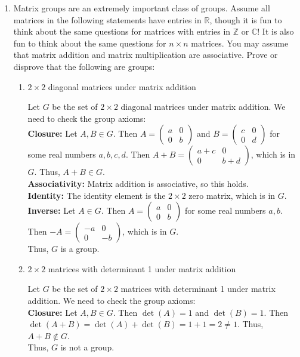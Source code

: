 \documentclass[10pt,twoside]{article}
\newcommand\R{\mathbb{R}}
\newcommand\C{\mathbb{C}}
\newcommand\Z{\mathbb{Z}}
\begin{document}
\begin{itemize}
\begin{enumerate}
\begin{enumerate}
\begin{solution}
            \end{solution}
		 \end{enumerate}		
 		 \item Matrix groups are an extremely important class of groups. Assume all matrices in the following statements have entries in $\R$, though it is fun to think about the same questions for matrices with entries in $\Z$ or $\C$! It is also fun to think about the same questions for $n \times n$ matrices. You may assume that matrix addition and matrix multiplication are associative. Prove or disprove that the following are groups:
		 \begin{enumerate}
		 	\item $2 \times 2$ diagonal matrices under matrix addition
		 	\begin{solution}
                Let $G$ be the set of $2 \times 2$ diagonal matrices under matrix addition. We need to check the group axioms: \\ 
                \textbf{Closure:} Let $A, B \in G$. Then $A = \begin{pmatrix} a & 0 \\ 0 & b \end{pmatrix}$ and $B = \begin{pmatrix} c & 0 \\ 0 & d \end{pmatrix}$ for some real numbers $a, b, c, d$. Then $A + B = \begin{pmatrix} a + c & 0 \\ 0 & b + d \end{pmatrix}$, which is in $G$. Thus, $A + B \in G$. \\
                \textbf{Associativity:} Matrix addition is associative, so this holds. \\
                \textbf{Identity:} The identity element is the $2 \times 2$ zero matrix, which is in $G$. \\
                \textbf{Inverse:} Let $A \in G$. Then $A = \begin{pmatrix} a & 0 \\ 0 & b \end{pmatrix}$ for some real numbers $a, b$. Then $-A = \begin{pmatrix} -a & 0 \\ 0 & -b \end{pmatrix}$, which is in $G$. \\
                Thus, $G$ is a group.
            \end{solution}
			\item $2 \times 2$ matrices with determinant 1 under matrix addition
			\begin{solution}
                Let $G$ be the set of $2 \times 2$ matrices with determinant 1 under matrix addition. We need to check the group axioms: \\ 
                \textbf{Closure:} Let $A, B \in G$. Then $\det(A) = 1$ and $\det(B) = 1$. Then $\det(A + B) = \det(A) + \det(B) = 1 + 1 = 2 \neq 1$. Thus, $A + B \notin G$. \\
                Thus, $G$ is not a group.


\end{solution}
\end{enumerate}
\end{enumerate}
\end{itemize}
\end{document}
